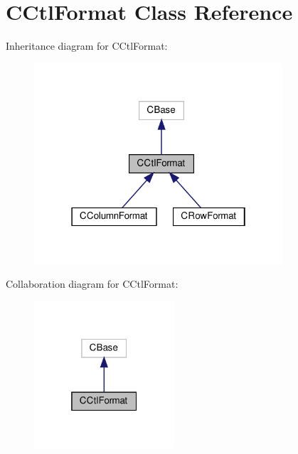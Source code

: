 \hypertarget{classCCtlFormat}{}\section{C\+Ctl\+Format Class Reference}
\label{classCCtlFormat}


Inheritance diagram for C\+Ctl\+Format\+:
\nopagebreak
\begin{figure}[H]
\begin{center}
\leavevmode
\includegraphics[width=262pt]{classCCtlFormat__inherit__graph}
\end{center}
\end{figure}


Collaboration diagram for C\+Ctl\+Format\+:
\nopagebreak
\begin{figure}[H]
\begin{center}
\leavevmode
\includegraphics[width=148pt]{classCCtlFormat__coll__graph}
\end{center}
\end{figure}
